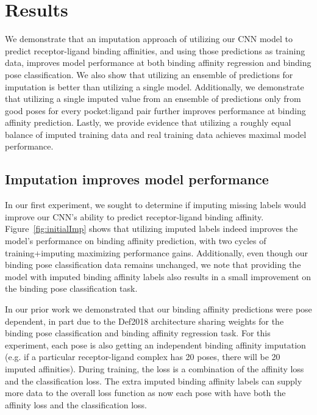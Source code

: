 \documentclass[journal=jmcmar,manuscript=article]{achemso}
\begin{document}

\section{Results}
We demonstrate that an imputation approach of utilizing our CNN model to predict receptor-ligand binding affinities, and using those predictions as training data, improves model performance at both binding affinity regression and binding pose classification.
We also show that utilizing an ensemble of predictions for imputation is better than utilizing a single model.
Additionally, we demonstrate that utilizing a single imputed value from an ensemble of predictions only from good poses for every pocket:ligand pair further improves performance at binding affinity prediction.
Lastly, we provide evidence that utilizing a roughly equal balance of imputed training data and real training data achieves maximal model performance.

\subsection{Imputation improves model performance}
In our first experiment, we sought to determine if imputing missing labels would improve our CNN's ability to predict receptor-ligand binding affinity.
Figure~\ref{fig:initialImp} shows that utilizing imputed labels indeed improves the model's performance on binding affinity prediction, with two cycles of training+imputing maximizing performance gains.
Additionally, even though our binding pose classification data remains unchanged, we note that providing the model with imputed binding affinity labels also results in a small improvement on the binding pose classification task.

In our prior work we demonstrated that our binding affinity predictions were pose dependent, in part due to the Def2018 architecture sharing weights for the binding pose classification and binding affinity regression task\cite{crossdocked2020}.
For this experiment, each pose is also getting an independent binding affinity imputation (e.g. if a particular receptor-ligand complex has 20 poses, there will be 20 imputed affinities).
During training, the loss is a combination of the affinity loss and the classification loss.
The extra imputed binding affinity labels can supply more data to the overall loss function as now each pose with have both the affinity loss and the classification loss.
\end{document}
